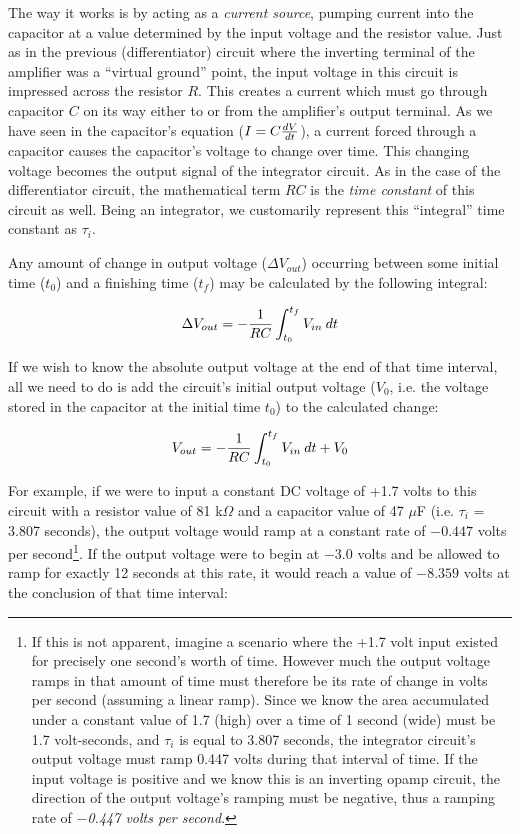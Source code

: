 The way it works is by acting as a \textit{current source}, pumping current into the capacitor at a value determined by the input voltage and the resistor value.  Just as in the previous (differentiator) circuit where the inverting terminal of the amplifier was a ``virtual ground'' point, the input voltage in this circuit is impressed across the resistor $R$.  This creates a current which must go through capacitor $C$ on its way either to or from the amplifier's output terminal.  As we have seen in the capacitor's equation ($I = C {dV \over dt}$), a current forced through a capacitor causes the capacitor's voltage to change over time.  This changing voltage becomes the output signal of the integrator circuit.  As in the case of the differentiator circuit, the mathematical term $RC$ is the \textit{time constant} of this circuit as well.  Being an integrator, we customarily represent this ``integral'' time constant as $\tau_i$.  

Any amount of change in output voltage ($\Delta V_{out}$) occurring between some initial time ($t_0$) and a finishing time ($t_f$) may be calculated by the following integral:

$$\Delta V_{out} = -{1 \over RC} \int_{t_0}^{t_f} V_{in} \> dt$$

If we wish to know the absolute output voltage at the end of that time interval, all we need to do is add the circuit's initial output voltage ($V_0$, i.e. the voltage stored in the capacitor at the initial time $t_0$) to the calculated change:

$$V_{out} = -{1 \over RC} \int_{t_0}^{t_f} V_{in} \> dt + V_0$$

\vskip 10pt

\filbreak

For example, if we were to input a constant DC voltage of +1.7 volts to this circuit with a resistor value of 81 k$\Omega$ and a capacitor value of 47 $\mu$F (i.e. $\tau_i$ = 3.807 seconds), the output voltage would ramp at a constant rate of $-0.447$ volts per second\footnote{If this is not apparent, imagine a scenario where the +1.7 volt input existed for precisely one second's worth of time.  However much the output voltage ramps in that amount of time must therefore be its rate of change in volts per second (assuming a linear ramp).  Since we know the area accumulated under a constant value of 1.7 (high) over a time of 1 second (wide) must be 1.7 volt-seconds, and $\tau_i$ is equal to 3.807 seconds, the integrator circuit's output voltage must ramp 0.447 volts during that interval of time.  If the input voltage is positive and we know this is an inverting opamp circuit, the direction of the output voltage's ramping must be negative, thus a ramping rate of \textit{$-$0.447 volts per second}.}.  If the output voltage were to begin at $-3.0$ volts and be allowed to ramp for exactly 12 seconds at this rate, it would reach a value of $-8.359$ volts at the conclusion of that time interval:

